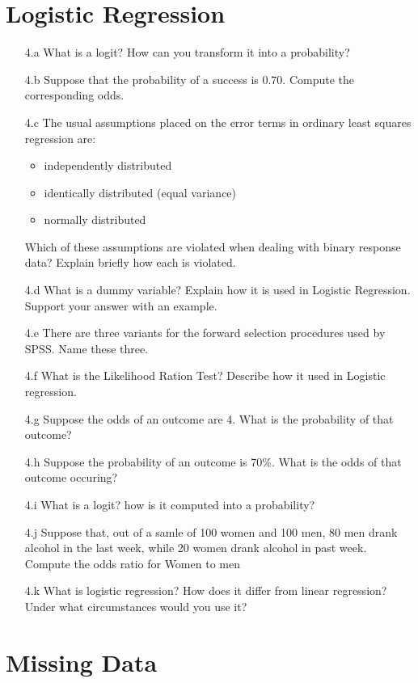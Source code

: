\documentclass[a4paper,12pt]{article}
\begin{document}
\section*{Logistic Regression}
\begin{itemize}

\item[4.a] What is a logit? How can you transform it into a probability?
\item[4.b] Suppose that the probability of a success is 0.70. Compute the corresponding odds.
\item[4.c] The usual assumptions placed on the error terms in ordinary least squares
regression are:
\begin{itemize}
\item independently distributed
\item identically distributed (equal variance)
\item normally distributed
\end{itemize}
Which of these assumptions are violated when dealing with binary response
data? Explain briefly how each is violated.
\item[4.d] What is a dummy variable? Explain how it is used in Logistic Regression. Support your answer with an example.
\item[4.e] There are three variants for the forward selection procedures used by SPSS. Name these three.
\item[4.f] What is the Likelihood Ration Test? Describe how it used in Logistic regression.
\item[4.g] Suppose the odds of an outcome are 4. What is the probability of that outcome?
\item[4.h] Suppose the probability of an outcome is 70\%. What is the odds of that outcome occuring?
\item[4.i]  What is a logit? how is it computed into a probability?
\item[4.j] Suppose that, out of a samle of 100 women and 100 men, 80 men drank alcohol in the last week, while 20 women drank alcohol in past week. Compute the odds ratio for Women to men
\item[4.k] What is logistic regression? How does it differ from linear regression? Under what circumstances would you use it?
\end{itemize}
\section*{Missing Data}
\end{document}
